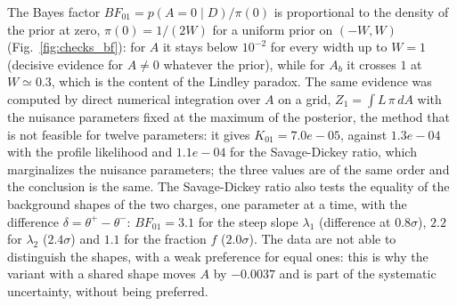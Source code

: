 \begin{table}[h]
\centering
{}
\caption{Posterior of $A$ under alternative priors, by importance reweighting of the chain; ESS: effective sample size of the $20{,}000$ thinned samples.}
\label{tab:checks_prior}
\end{table}

The Bayes factor $BF_{01}=p(A=0\mid D)/\pi(0)$ is proportional to the density of the prior at zero, $\pi(0)=1/(2W)$ for a uniform prior on $(-W,W)$ (Fig.~\ref{fig:checks_bf}): for $A$ it stays below $10^{-2}$ for every width up to $W=1$ (decisive evidence for $A\neq0$ whatever the prior), while for $A_b$ it crosses $1$ at $W\simeq0.3$, which is the content of the Lindley paradox. The same evidence was computed by direct numerical integration over $A$ on a grid, $Z_1=\int L\,\pi\,dA$ with the nuisance parameters fixed at the maximum of the posterior, the method that is not feasible for twelve parameters: it gives $K_{01}=7.0e-05$, against $1.3e-04$ with the profile likelihood and $1.1e-04$ for the Savage-Dickey ratio, which marginalizes the nuisance parameters; the three values are of the same order and the conclusion is the same.
The Savage-Dickey ratio also tests the equality of the background shapes of the two charges, one parameter at a time, with the difference $\delta=\theta^+-\theta^-$: $BF_{01}=3.1$ for the steep slope $\lambda_1$ (difference at $0.8\sigma$), $2.2$ for $\lambda_2$ ($2.4\sigma$) and $1.1$ for the fraction $f$ ($2.0\sigma$). The data are not able to distinguish the shapes, with a weak preference for equal ones: this is why the variant with a shared shape moves $A$ by $-0.0037$ and is part of the systematic uncertainty, without being preferred.
